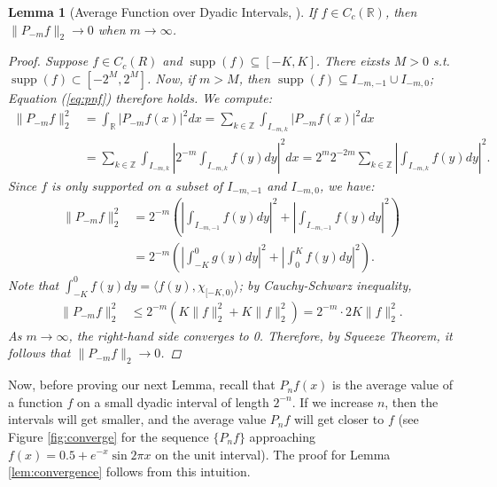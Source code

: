 \documentclass[11pt]{amsart}
\theoremstyle{theorem} %
\newtheorem{lem}[thm]{Lemma} %
\theoremstyle{definition}
\theoremstyle{example}
\theoremstyle{remark}
\numberwithin{equation}{section}
\newcommand{\R}{\mathbb{R}}
\newcommand{\Z}{\mathbb{Z}}
\DeclareMathOperator*{\supp}{supp}
\begin{document}
\begin{lem}[Average Function over Dyadic Intervals, {\cite[295]{pinsky}}] \label{lem:average}
	If $ f \in C_c(\R) $, then $ \|P_{-m}f\|_2 \to 0 $ when $ m \to \infty $.
	
	\begin{proof}
		Suppose $ f \in C_c(R) $ and $ \supp(f) \subseteq [-K,K] $. There eixsts $ M > 0 $ s.t. $ \supp(f) \subset [-2^M, 2^M] $. Now, if $ m > M $, then $ \supp(f) \subseteq I_{-m,-1} \cup I_{-m,0} $; Equation (\ref{eq:pnf}) therefore holds.
		We compute:
		\begin{align*}
			\| P_{-m}f \|_2^2 &= \int_{\R} \left| P_{-m}f(x) \right|^2 dx 
			= \sum_{k \in \Z} \int_{I_{-m,k}} |P_{-m}f(x)|^2 dx \\
			&= \sum_{k \in \Z} \int_{I_{-m,k}} \left|2^{-m} \int_{I_{-m,k}} f(y) dy \right|^2 dx
			= 2^{m}  2^{-2m} \sum_{k \in \Z} \left|\int_{I_{-m,k}} f(y) dy \right|^2.
		\end{align*}
		Since $ f $ is only supported on a subset of $ I_{-m,-1} $ and $ I_{-m,0} $, we have:
		\begin{align*}
		\| P_{-m}f \|_2^2	&= 2^{-m} \left( \left|\int_{I_{-m,-1}} f(y) dy \right|^2 + \left| \int_{I_{-m,-1}} f(y) dy \right|^2 \right) \\
			&=  2^{-m} \left( \left|\int_{-K}^0 g(y) dy \right|^2 + \left| \int_{0}^K f(y) dy \right|^2 \right).
		\end{align*}
		Note that $ \int_{-K}^0 f(y) dy = \langle f(y),\chi_{[-K,0)}  \rangle $; by Cauchy-Schwarz inequality,
		\begin{align*}
		\| P_{-m}f \|_2^2	&\leq  2^{-m} \left( K \|f\|_2^2 + K \|f\|_2^2 \right) = 2^{-m} \cdot 2K \|f\|_2^2.
		\end{align*}
		As $ m \to \infty $, the right-hand side converges to 0. Therefore, by Squeeze Theorem, it follows that $ \|P_{-m}f\|_2 \to 0 $.
	\end{proof}
\end{lem}

Now, before proving our next Lemma, recall that $ P_nf(x) $ is the average value of a function $ f $ on a small dyadic interval of length $ 2^{-n} $. If we increase $ n $, then the intervals will get smaller, and the average value $ P_nf $ will get closer to $ f $ (see Figure \ref{fig:converge} for the sequence $ \{P_nf\} $ approaching $ f(x) = 0.5 + e^{-x} \sin{2\pi x} $ on the unit interval). The proof for Lemma \ref{lem:convergence} follows from this intuition.
\end{document}
